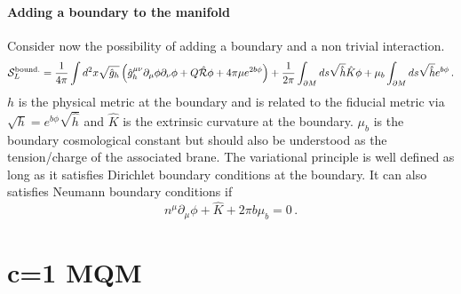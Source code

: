 \documentclass[a4paper]{article}
\begin{document}
\paragraph{Adding a boundary to the manifold}
Consider now the possibility of adding a boundary and a non trivial interaction.
\begin{equation}
  \mathcal{S}^{\rm bound .}_L = \frac{1}{4\pi}\int d^2x \sqrt{\hat{g}_h}\left(\hat{g}^{\mu \nu}_h \partial_\mu \phi \partial_\nu \phi +Q \hat{\mathcal{R}}\phi+4\pi\mu e^{2b\phi}\right) + \frac{1}{2\pi}\int_{\partial M}ds \sqrt{\hat{h}}\hat{K}\phi + \mu_b\int_{\partial M} ds \sqrt{\hat{h}}e^{b\phi}\,.
\end{equation}
$h$ is the physical metric at the boundary and is related to the fiducial metric via $\sqrt{h}=e^{b\phi}\sqrt{\hat{h}}$ and $\hat{K}$ is the extrinsic curvature at the boundary. $\mu_b$ is the boundary cosmological constant but should also be understood as the tension/charge of the associated brane. The variational principle is well defined as long as it satisfies Dirichlet boundary conditions at the boundary. It can also satisfies Neumann boundary conditions if
\begin{equation}
  n^{\mu}\partial_\mu\phi + \hat{K} +2\pi b \mu_b =0\,.
\end{equation}

\section{c=1 MQM}
\end{document}
